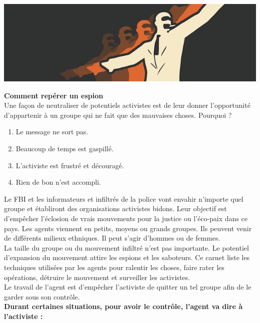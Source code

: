 \documentclass[11pt,twoside,a4paper]{article}
\begin{document}

\includegraphics[width=\textwidth]{img/troll.png}

\textbf{\Large Comment rep{\'e}rer un espion}~\\

Une fa\c{c}on de neutraliser de potentiels activistes est de leur donner l'opportunit{\'e} d'appartenir {\`a} un groupe qui ne fait que des mauvaises choses. Pourquoi ?
\setlength\parindent{20pt}
\begin{enumerate}
	\item Le message ne sort pas. 
	\item Beaucoup de temps est gaspill{\'e}. 
	\item L'activiste est frustr{\'e} et d{\'e}courag{\'e}. 
	\item Rien de bon n'est accompli. 
\end{enumerate}
\setlength\parindent{0pt}

Le FBI et les informateurs et infiltr{\'e}s de la police vont envahir n'importe quel groupe et {\'e}tabliront des organisations activistes bidons. Leur objectif est d'emp{\^e}cher l'{\'e}closion de vrais mouvements pour la justice ou l'{\'e}co-paix dans ce pays. Les agents viennent en petits, moyens ou grands groupes. Ils peuvent venir de diff{\'e}rents milieux ethniques. Il peut s'agir d'hommes ou de femmes.~\\

La taille du groupe ou du mouvement infiltr{\'e} n'est pas importante. Le potentiel d'expansion du mouvement attire les espions et les saboteurs. Ce carnet liste les techniques utilis{\'e}es par les agents pour ralentir les choses, faire rater les op{\'e}rations, d{\'e}truire le mouvement et surveiller les activistes.~\\

Le travail de l'agent est d'emp{\^e}cher l'activiste de quitter un tel groupe afin de le garder sous son contr{\^o}le.~\\

\textbf{Durant certaines situations, pour avoir le contr{\^o}le, l'agent va dire {\`a} l'activiste : }~\\
\setlength\parindent{50pt}
	
\end{document}
